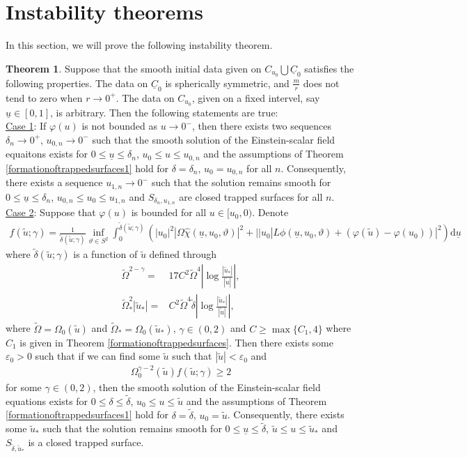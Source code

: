 \documentclass[11pt,reqno]{amsart}
\theoremstyle{definition}
\newtheorem{theorem}{Theorem}[section]
\numberwithin{equation}{section}
\newcommand{\D}{\mathrm{d}}
\def\chih{\widehat{\chi}}
\def\ub{\underline{u}}
\def\Cb{\underline{C}}
\newcommand{\tdelta}{\widetilde{\delta}}
\newcommand{\tu}{\widetilde{u}}
\begin{document}
\section{Instability theorems}\label{Secinstability}

In this section, we will prove the following instability theorem.
\begin{theorem}\label{instabilitytheorem}
Suppose that the smooth initial data given on $C_{u_0}\bigcup \Cb_0$ satisfies the following properties.  The data on $\Cb_0$ is spherically symmetric, and $\frac{m}{r}$ does not tend to zero when $r\to0^+$. The data on $C_{u_0}$, given on a fixed intervel, say $\ub\in[0,1]$, is arbitrary. Then the following statements are true:
\\
\indent \underline{Case 1}: If $\varphi(u)$ is not bounded as $u\to 0^-$, then there exists two sequences $\delta_n\to0^+$, $u_{0,n}\to0^-$ such that the smooth solution of the Einstein-scalar field equaitons exists for $0\le\ub\le \delta_n$, $u_0\le u\le u_{0,n}$ and the assumptions of Theorem \ref{formationoftrappedsurfaces1} hold for $\delta=\delta_n$, $u_0=u_{0,n}$ for all $n$. Consequently,  there exists a sequence $u_{1,n}\to0^-$ such that the solution remains smooth for $0\le\ub\le\delta_n$, $u_{0,n}\le u_0\le u_{1,n}$ and $S_{\delta_n,u_{1,n}}$ are closed trapped surfaces for all $n$.
\\
\indent\underline{Case 2}: Suppose that $\varphi(u)$ is bounded for all $u\in[u_0,0)$. Denote
\begin{align}\label{def-f}
f(\widetilde{u};\gamma)=\frac{1}{\tdelta(\tu;\gamma)}\inf_{\vartheta\in S^2}\int_0^{\tdelta(\tu;\gamma)}(|u_0|^2|\Omega\chih(\ub,u_0,\vartheta)|^2+||u_0|L\phi(\ub,u_0,\vartheta)+(\varphi(\tu)-\varphi(u_0))|^2)\D\ub
\end{align}
where $\tdelta(\tu;\gamma)$ is a function of $\tu$ defined through
\begin{align}
\label{u*tilde}\widetilde{\Omega}^{2-\gamma}=&17C^2\widetilde{\Omega}^4\left|\log\frac{|\widetilde{u}_*|}{|\widetilde{u}|}\right|,\\
\label{deltatilde}\widetilde{\Omega}_*^2|\widetilde{u}_*|=&C^2\widetilde{\Omega}^4\widetilde{\delta}\left|\log\frac{|\widetilde{u}_*|}{|\widetilde{u}|}\right|,
\end{align} 
where $\widetilde{\Omega}=\Omega_0(\tu)$ and $\widetilde{\Omega}_*=\Omega_0(\tu_*)$, $\gamma\in(0,2)$ and $C\ge \max\{C_1,4\}$ where $C_1$ is given in Theorem \ref{formationoftrappedsurfaces}. Then there exists some $\varepsilon_0>0$ such that if we can find some $\tu$ such that $|\tu|<\varepsilon_0$ and
\begin{align}\label{instabilitycondition}
\Omega_0^{\gamma-2}(\widetilde{u})f(\tu;\gamma)\ge2
\end{align}
for some $\gamma\in(0,2)$, then the smooth solution of the Einstein-scalar field equations exists for $0\le\delta\le\tdelta$, $u_0\le u\le \tu$ and the assumptions of Theorem \ref{formationoftrappedsurfaces1} hold for $\delta=\tdelta$, $u_0=\tu$. Consequently, there exists some $\tu_*$ such that the solution remains smooth for $0\le\ub\le\tdelta$, $\tu\le u\le \tu_*$ and $S_{\tdelta,\tu_*}$ is a closed trapped surface.
\end{theorem}
\end{document}
